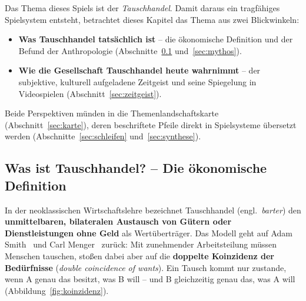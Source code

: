 \documentclass[11pt, a4paper]{article}
\begin{document}
Das Thema dieses Spiels ist der \emph{Tauschhandel}. Damit daraus ein tragfähiges
Spielsystem entsteht, betrachtet dieses Kapitel das Thema aus zwei Blickwinkeln:
\begin{itemize}
    \item \textbf{Was Tauschhandel tatsächlich ist} -- die ökonomische Definition
          und der Befund der Anthropologie (Abschnitte~\ref{sec:definition}
          und~\ref{sec:mythos}).
    \item \textbf{Wie die Gesellschaft Tauschhandel heute wahrnimmt} -- der
          subjektive, kulturell aufgeladene Zeitgeist und seine Spiegelung in
          Videospielen (Abschnitt~\ref{sec:zeitgeist}).
\end{itemize}
Beide Perspektiven münden in die Themenlandschaftskarte
(Abschnitt~\ref{sec:karte}), deren beschriftete Pfeile direkt in
Spielsysteme übersetzt werden (Abschnitte~\ref{sec:schleifen}
und~\ref{sec:synthese}).

\subsection{Was ist Tauschhandel? -- Die ökonomische Definition}
\label{sec:definition}

In der neoklassischen Wirtschaftslehre bezeichnet Tauschhandel (engl.\
\emph{barter}) den \textbf{unmittelbaren, bilateralen Austausch von Gütern oder
Dienstleistungen ohne Geld} als Wertüberträger. Das Modell geht auf Adam
Smith~\cite{smith1776} und Carl Menger~\cite{menger1892} zurück: Mit
zunehmender Arbeitsteilung müssen Menschen tauschen, stoßen dabei aber auf die
\textbf{doppelte Koinzidenz der Bedürfnisse} (\emph{double coincidence of
wants}). Ein Tausch kommt nur zustande, wenn A genau das besitzt, was B will --
und B gleichzeitig genau das, was A will (Abbildung~\ref{fig:koinzidenz}).
\end{document}
